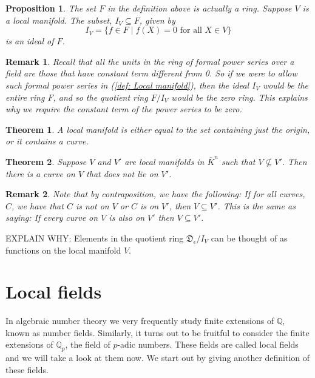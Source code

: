 \documentclass{article}
\newtheorem{theorem}{Theorem}[section]
\newtheorem{proposition}{Proposition}[section]
\newtheorem{remark}{Remark}[section]
\newcommand{\mfrak}[1]{\mathfrak{#1}}
\newcommand{\mbb}[1]{\mathbb{#1}}
\begin{document}
\begin{proposition}
    The set $F$ in the definition above is actually a ring. Suppose $V$ is a local manifold. The subset, $I_V \subseteq F$, given by 
    $$I_V = \{ f \in F \mid f(X) = 0 \text{ for all } X \in V\}$$ 
    is an ideal of $F$.
\end{proposition}

\begin{remark}
    Recall that all the units in the ring of formal power series over a field are those that have constant term different from 0. So if we were to allow such formal power series in (\ref{def: Local manifold}), then the ideal $I_V$ would be the entire ring $F$, and so the quotient ring $F / I_V$ would be the zero ring. This explains why we require the constant term of the power series to be zero.
\end{remark}


\begin{theorem}
    A local manifold is either equal to the set containing just the origin, or it contains a curve.
\end{theorem}

\begin{theorem}
    Suppose $V$ and $V'$ are local manifolds in $\overline K^n$ such that $V \nsubseteq V'$. Then there is a curve on $V$ that does not lie on $V'$.
\end{theorem}
\begin{remark}
    Note that by contraposition, we have the following: If for all curves, $C$, we have that $C$ is not on $V$ or $C$ is on $V'$, then $V \subseteq V'$. This is the same as saying: If every curve on $V$ is also on $V'$ then $V \subseteq V'$.
\end{remark}




EXPLAIN WHY: Elements in the quotient ring $\mfrak D_\epsilon / I_V$ can be thought of as functions on the local manifold $V$.


\section{Local fields}
In algebraic number theory we very frequently study finite extensions of $\mbb Q$, known as number fields. Similarly, it turns out to be fruitful to consider the finite extensions of $\mbb Q_p$, the field of $p$-adic numbers. These fields are called local fields and we will take a look at them now. We start out by giving another definition of these fields.
\end{document}
